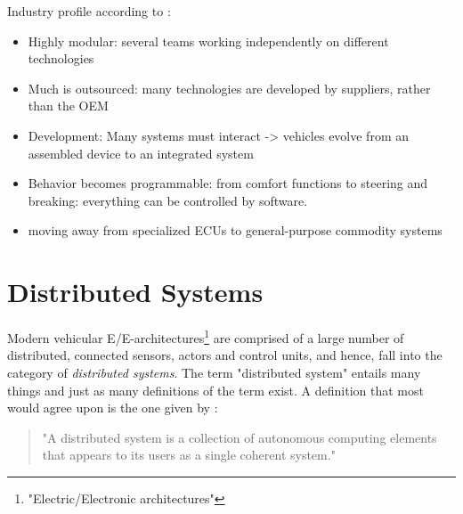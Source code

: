 Industry profile according to \citeauthor*{broy2006challenges}:
\begin{itemize}
\item Highly modular: several teams working independently on different technologies
\item Much is outsourced: many technologies are developed by suppliers, rather than the OEM 
\item Development: Many systems must interact -> vehicles evolve from an assembled device to an integrated system
\item Behavior becomes programmable: from comfort functions to steering and breaking: everything can be controlled by software.
\item moving away from specialized ECUs to general-purpose commodity systems
\end{itemize}

%
%
%
%
%
%
%
%
%
%

\section{Distributed Systems}
Modern vehicular E/E-architectures\footnote{"Electric/Electronic architectures"} are comprised of a large number of distributed, connected sensors, actors and control units, and hence, fall into the category of \emph{distributed systems}. The term "distributed system" entails many things and just as many definitions of the term exist. A definition that most would agree upon is the one given by \citeauthor*{tanenbaum2017distributed} \cite{tanenbaum2017distributed}: 
\begin{quote}
"A distributed system is a collection of autonomous computing elements that appears to its users as a single coherent system."
\end{quote}

